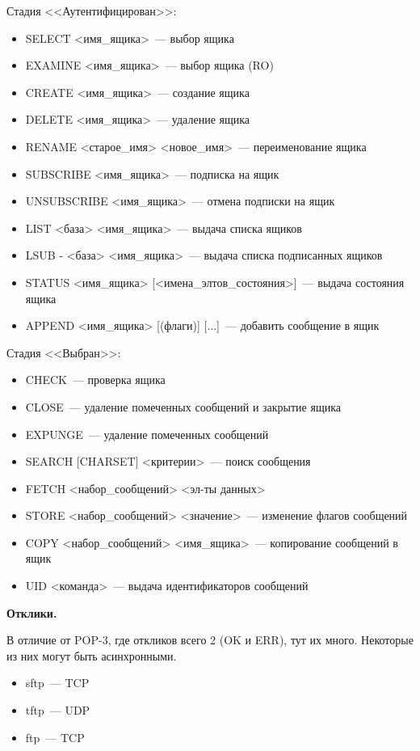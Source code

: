 Стадия <<Аутентифицирован>>:
\begin{itemize}
    \item SELECT <имя\_ящика>~--- выбор ящика
    \item EXAMINE <имя\_ящика>~--- выбор ящика (RO)
    \item CREATE <имя\_ящика>~--- создание ящика
    \item DELETE <имя\_ящика>~--- удаление ящика
    \item RENAME <старое\_имя> <новое\_имя>~--- переименование ящика
    \item SUBSCRIBE <имя\_ящика>~--- подписка на ящик
    \item UNSUBSCRIBE <имя\_ящика>~--- отмена подписки на ящик
    \item LIST <база> <имя\_ящика>~--- выдача списка ящиков
    \item LSUB - <база> <имя\_ящика>~--- выдача списка подписанных ящиков
    \item STATUS <имя\_ящика> [<имена\_элтов\_состояния>]~--- выдача состояния ящика
    \item APPEND <имя\_ящика> [(флаги)] [...]~--- добавить сообщение в ящик
\end{itemize}

Стадия <<Выбран>>:
\begin{itemize}
    \item CHECK~--- проверка ящика
    \item CLOSE~--- удаление помеченных сообщений и закрытие ящика
    \item EXPUNGE~--- удаление помеченных сообщений
    \item SEARCH [CHARSET] <критерии>~--- поиск сообщения
    \item FETCH <набор\_сообщений> <эл-ты данных>
    \item STORE <набор\_сообщений> <значение>~--- изменение флагов сообщений
    \item COPY <набор\_сообщений> <имя\_ящика>~--- копирование сообщений в ящик
    \item UID <команда>~--- выдача идентификаторов сообщений
\end{itemize}

{\bf Отклики.}

В отличие от POP-3, где откликов всего 2 (OK и ERR), тут их много. Некоторые из них могут быть асинхронными.


\begin{itemize}
    \item sftp~--- TCP
    \item tftp~--- UDP
    \item ftp~--- TCP
\end{itemize}

